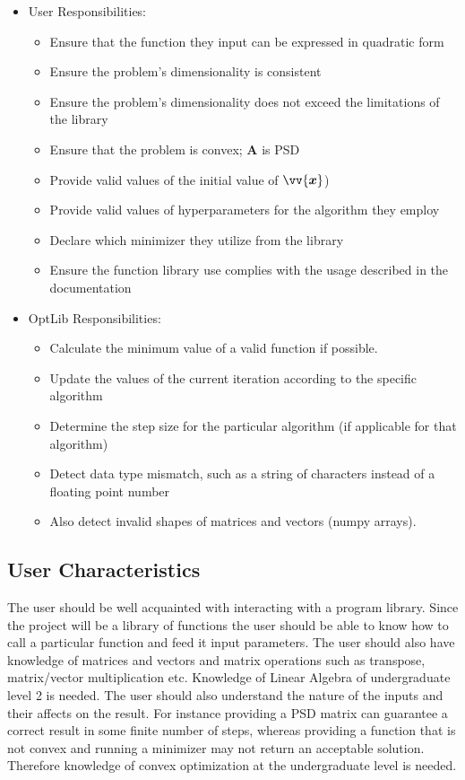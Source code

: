 \documentclass[12pt]{article}
\begin{document}
\begin{itemize}
\item User Responsibilities:
\begin{itemize}
\item Ensure that the function they input can be expressed in quadratic form
\item Ensure the problem's dimensionality is consistent
\item Ensure the problem's dimensionality does not exceed the limitations of the library
\item Ensure that the problem is convex; $\mathbf{A}$ is PSD
\item Provide valid values of the initial value of $\vv{\bm{x}}$)
\item Provide valid values of hyperparameters for the algorithm they employ
\item Declare which minimizer they utilize from the library
\item Ensure the function library use complies with the usage described in the documentation
\end{itemize}
\item OptLib Responsibilities:
\begin{itemize}
\item Calculate the minimum value of a valid function if possible.
\item Update the values of the current iteration according to the specific algorithm
\item Determine the step size for the particular algorithm (if applicable for that algorithm)
\item Detect data type mismatch, such as a string of characters instead of a
  floating point number
\item Also detect invalid shapes of matrices and vectors (numpy arrays).
\end{itemize}
\end{itemize}



\subsection{User Characteristics} \label{SecUserCharacteristics}
The user should be well acquainted with interacting with a program library. Since the project will be a library of functions the user should be able to know how to call a particular function and feed it input parameters. The user should also have knowledge of matrices and vectors and matrix operations such as transpose, matrix/vector multiplication etc. Knowledge of Linear Algebra of undergraduate level 2 is needed. The user should also understand the nature of the inputs and their affects on the result. For instance providing a PSD matrix can guarantee a correct result in some finite number of steps, whereas providing a function that is not convex and running a minimizer may not return an acceptable solution. Therefore knowledge of convex optimization at the undergraduate level is needed. 
\\
\end{document}
